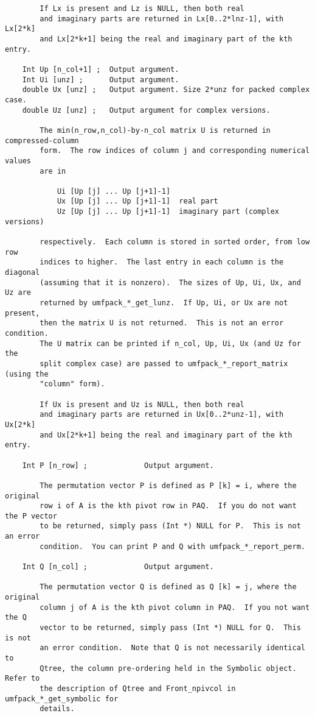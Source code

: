 \documentclass[11pt]{article}
\begin{document}
{\begin{verbatim}
        If Lx is present and Lz is NULL, then both real
        and imaginary parts are returned in Lx[0..2*lnz-1], with Lx[2*k]
        and Lx[2*k+1] being the real and imaginary part of the kth entry.

    Int Up [n_col+1] ;  Output argument.
    Int Ui [unz] ;      Output argument.
    double Ux [unz] ;   Output argument. Size 2*unz for packed complex case.
    double Uz [unz] ;   Output argument for complex versions.

        The min(n_row,n_col)-by-n_col matrix U is returned in compressed-column
        form.  The row indices of column j and corresponding numerical values
        are in

            Ui [Up [j] ... Up [j+1]-1]
            Ux [Up [j] ... Up [j+1]-1]  real part
            Uz [Up [j] ... Up [j+1]-1]  imaginary part (complex versions)

        respectively.  Each column is stored in sorted order, from low row
        indices to higher.  The last entry in each column is the diagonal
        (assuming that it is nonzero).  The sizes of Up, Ui, Ux, and Uz are
        returned by umfpack_*_get_lunz.  If Up, Ui, or Ux are not present,
        then the matrix U is not returned.  This is not an error condition.
        The U matrix can be printed if n_col, Up, Ui, Ux (and Uz for the
        split complex case) are passed to umfpack_*_report_matrix (using the
        "column" form).

        If Ux is present and Uz is NULL, then both real
        and imaginary parts are returned in Ux[0..2*unz-1], with Ux[2*k]
        and Ux[2*k+1] being the real and imaginary part of the kth entry.

    Int P [n_row] ;             Output argument.

        The permutation vector P is defined as P [k] = i, where the original
        row i of A is the kth pivot row in PAQ.  If you do not want the P vector
        to be returned, simply pass (Int *) NULL for P.  This is not an error
        condition.  You can print P and Q with umfpack_*_report_perm.

    Int Q [n_col] ;             Output argument.

        The permutation vector Q is defined as Q [k] = j, where the original
        column j of A is the kth pivot column in PAQ.  If you not want the Q
        vector to be returned, simply pass (Int *) NULL for Q.  This is not
        an error condition.  Note that Q is not necessarily identical to
        Qtree, the column pre-ordering held in the Symbolic object.  Refer to
        the description of Qtree and Front_npivcol in umfpack_*_get_symbolic for
        details.


\end{verbatim}}
\end{document}
